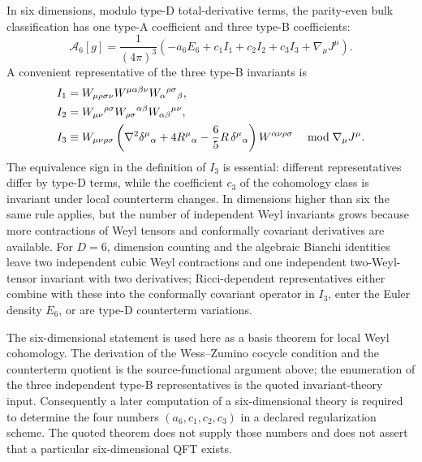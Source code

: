 \begin{quotedtheorem}
\label{qthm:six-dimensional-parity-even-weyl-anomaly}
In six dimensions, modulo type-D total-derivative terms, the parity-even bulk
classification has one type-A coefficient and three type-B coefficients:
\begin{equation}
  \mathcal A_6[g]
  =
  \frac{1}{(4\pi)^3}
  \left(
    -a_6E_6+c_1I_1+c_2I_2+c_3I_3
    +\nabla_\mu J^\mu
  \right).
  \label{eq:six-dimensional-weyl-anomaly-classification}
\end{equation}
A convenient representative of the three type-B invariants is
\begin{align}
  I_1
  &=
  W_{\mu\rho\sigma\nu}
  W^{\mu\alpha\beta\nu}
  W_{\alpha}{}^{\rho\sigma}{}_{\beta},
  \notag\\
  I_2
  &=
  W_{\mu\nu}{}^{\rho\sigma}
  W_{\rho\sigma}{}^{\alpha\beta}
  W_{\alpha\beta}{}^{\mu\nu},
  \notag\\
  I_3
  &\equiv
  W_{\mu\nu\rho\sigma}
  \left(
    \nabla^2\delta^\mu{}_\alpha
    +4R^\mu{}_\alpha
    -\frac65R\,\delta^\mu{}_\alpha
  \right)
  W^{\alpha\nu\rho\sigma}
  \quad
  \bmod \nabla_\mu J^\mu .
  \label{eq:six-dimensional-type-b-invariants}
\end{align}
The equivalence sign in the definition of \(I_3\) is essential: different
representatives differ by type-D terms, while the coefficient \(c_3\) of the
cohomology class is invariant under local counterterm changes.  In dimensions
higher than six the same rule applies, but the number of independent Weyl
invariants grows because more contractions of Weyl tensors and conformally
covariant derivatives are available.
For \(D=6\), dimension counting and the algebraic Bianchi identities leave
two independent cubic Weyl contractions and one independent
two-Weyl-tensor invariant with two derivatives; Ricci-dependent representatives
either combine with these into the conformally covariant operator in \(I_3\),
enter the Euler density \(E_6\), or are type-D counterterm variations.
\end{quotedtheorem}

The six-dimensional statement is used here as a basis theorem for local Weyl
cohomology.  The derivation of the Wess--Zumino cocycle condition and the
counterterm quotient is the source-functional argument above; the enumeration
of the three independent type-B representatives is the quoted invariant-theory
input.  Consequently a later computation of a six-dimensional theory is
required to determine the four numbers \((a_6,c_1,c_2,c_3)\) in a declared
regularization scheme.  The quoted theorem does not supply those numbers and
does not assert that a particular six-dimensional QFT exists.

